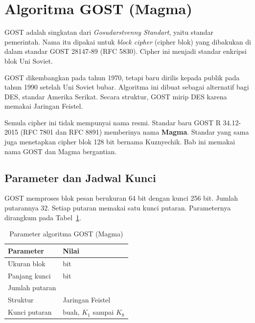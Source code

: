 \section{Algoritma GOST (Magma)}
\label{sec:gost}


GOST adalah singkatan dari \textit{Gosudarstvenny Standart}, yaitu standar
pemerintah. Nama itu dipakai untuk \textit{block cipher} (cipher blok) yang
dibakukan di dalam standar GOST 28147-89 (RFC 5830). Cipher ini menjadi standar
enkripsi blok Uni Soviet.

GOST dikembangkan pada tahun 1970, tetapi baru dirilis kepada publik pada tahun
1990 setelah Uni Soviet bubar. Algoritma ini dibuat sebagai alternatif bagi DES,
standar Amerika Serikat. Secara struktur, GOST mirip DES karena memakai Jaringan
Feistel.

Semula cipher ini tidak mempunyai nama resmi. Standar baru GOST R 34.12-2015
(RFC 7801 dan RFC 8891) memberinya nama \textbf{Magma}. Standar yang sama juga
menetapkan cipher blok 128 bit bernama Kuznyechik. Bab ini memakai nama GOST dan
Magma bergantian.

\subsection{Parameter dan Jadwal Kunci}

GOST memproses blok pesan berukuran 64 bit dengan kunci 256 bit. Jumlah putarannya
32. Setiap putaran memakai satu kunci putaran. Parameternya dirangkum pada
Tabel~\ref{tab:parameter-gost}.

\begin{table}[htbp]
    \centering
    \begin{tabularx}{0.72\linewidth}{@{}l >{\raggedright\arraybackslash}X@{}}
    \toprule
    \textbf{Parameter} & \textbf{Nilai} \\
    \midrule
    Ukuran blok       & 64 bit \\
    Panjang kunci     & 256 bit \\
    Jumlah putaran    & 32 \\
    Struktur          & Jaringan Feistel \\
    Kunci putaran     & 8 buah, $K_1$ sampai $K_8$ \\
    \bottomrule
    \end{tabularx}
    \caption{Parameter algoritma GOST (Magma)}
    \label{tab:parameter-gost}
\end{table}

